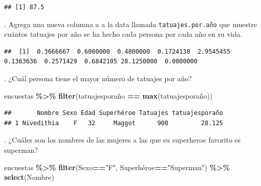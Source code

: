 \documentclass[
]{book}
\newenvironment{Shaded}{\begin{snugshade}}{\end{snugshade}}
\newcommand{\FunctionTok}[1]{\textcolor[rgb]{0.13,0.29,0.53}{\textbf{#1}}}
\newcommand{\NormalTok}[1]{#1}
\newcommand{\OtherTok}[1]{\textcolor[rgb]{0.56,0.35,0.01}{#1}}
\newcommand{\SpecialCharTok}[1]{\textcolor[rgb]{0.81,0.36,0.00}{\textbf{#1}}}
\newcommand{\StringTok}[1]{\textcolor[rgb]{0.31,0.60,0.02}{#1}}
\begin{document}
\begin{verbatim}
## [1] 87.5
\end{verbatim}

\hfill{}.
Agrega una nueva columna a a la data llamada \texttt{tatuajes.por.año} que muestre cuántos tatuajes por año se ha hecho cada persona por cada año en su vida.\\

\begin{Shaded}
\end{Shaded}

\begin{verbatim}
##  [1]  0.3666667  0.6000000  0.4800000  0.1724138  2.9545455  0.1363636  0.2571429  0.6842105 28.1250000  0.0000000
\end{verbatim}

\hfill{}.
¿Cuál persona tiene el mayor número de tatuajes por año?\\

\begin{Shaded}
\begin{Highlighting}[]
\NormalTok{encuestas  }\SpecialCharTok{\%\textgreater{}\%} \FunctionTok{filter}\NormalTok{(tatuajesporaño }\SpecialCharTok{==} \FunctionTok{max}\NormalTok{(tatuajesporaño)) }
\end{Highlighting}
\end{Shaded}

\begin{verbatim}
##       Nombre Sexo Edad Superhéroe Tatuajes tatuajesporaño
## 1 Nivedithia    F   32     Maggot      900         28.125
\end{verbatim}

\hfill{}.
¿Cuáles son los nombres de las mujeres a las que su superheroe favorito es superman?\\

\begin{Shaded}
\begin{Highlighting}[]
\NormalTok{encuestas }\SpecialCharTok{\%\textgreater{}\%} \FunctionTok{filter}\NormalTok{(Sexo}\SpecialCharTok{==}\StringTok{"F"}\NormalTok{, Superhéroe}\SpecialCharTok{==}\StringTok{"Superman"}\NormalTok{) }\SpecialCharTok{\%\textgreater{}\%} \FunctionTok{select}\NormalTok{(Nombre)}
\end{Highlighting}
\end{Shaded}
\end{document}
